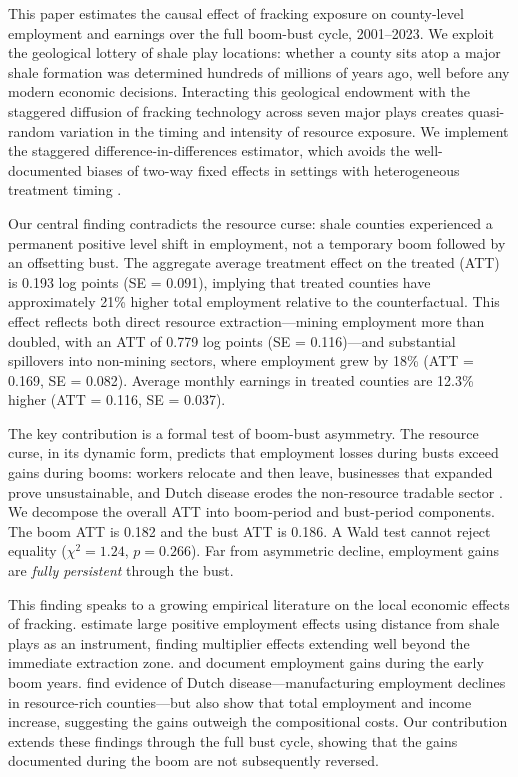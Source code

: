 \documentclass[12pt]{article}
\begin{document}
This paper estimates the causal effect of fracking exposure on county-level employment and earnings over the full boom-bust cycle, 2001--2023. We exploit the geological lottery of shale play locations: whether a county sits atop a major shale formation was determined hundreds of millions of years ago, well before any modern economic decisions. Interacting this geological endowment with the staggered diffusion of fracking technology across seven major plays creates quasi-random variation in the timing and intensity of resource exposure. We implement the \citet{callaway2021difference} staggered difference-in-differences estimator, which avoids the well-documented biases of two-way fixed effects in settings with heterogeneous treatment timing \citep{sun2021estimating, goodman2021difference, dechaisemartin2020two, borusyak2024revisiting}.

Our central finding contradicts the resource curse: shale counties experienced a permanent positive level shift in employment, not a temporary boom followed by an offsetting bust. The aggregate average treatment effect on the treated (ATT) is 0.193 log points (SE = 0.091), implying that treated counties have approximately 21\% higher total employment relative to the counterfactual. This effect reflects both direct resource extraction---mining employment more than doubled, with an ATT of 0.779 log points (SE = 0.116)---and substantial spillovers into non-mining sectors, where employment grew by 18\% (ATT = 0.169, SE = 0.082). Average monthly earnings in treated counties are 12.3\% higher (ATT = 0.116, SE = 0.037).

The key contribution is a formal test of boom-bust asymmetry. The resource curse, in its dynamic form, predicts that employment losses during busts exceed gains during booms: workers relocate and then leave, businesses that expanded prove unsustainable, and Dutch disease erodes the non-resource tradable sector \citep{jacobsen2016resource, black2005boom}. We decompose the overall ATT into boom-period and bust-period components. The boom ATT is 0.182 and the bust ATT is 0.186. A Wald test cannot reject equality ($\chi^2 = 1.24$, $p = 0.266$). Far from asymmetric decline, employment gains are \emph{fully persistent} through the bust.

This finding speaks to a growing empirical literature on the local economic effects of fracking. \citet{feyrer2017geographic} estimate large positive employment effects using distance from shale plays as an instrument, finding multiplier effects extending well beyond the immediate extraction zone. \citet{weber2012shale} and \citet{maniloff2017local} document employment gains during the early boom years. \citet{allcott2018dutch} find evidence of Dutch disease---manufacturing employment declines in resource-rich counties---but also show that total employment and income increase, suggesting the gains outweigh the compositional costs. Our contribution extends these findings through the full bust cycle, showing that the gains documented during the boom are not subsequently reversed.
\end{document}
